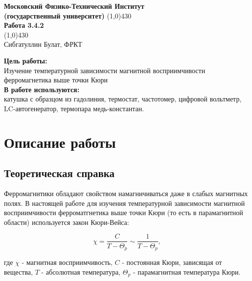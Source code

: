 \documentclass[a4paper, 12pt]{article}%
\begin{document}
\begin{titlepage}

\begin{center}
\large\textbf{Московский Физико-Технический Институт}\\
\large\textbf{(государственный университет)}
\vfill
\line(1,0){430}\\[1mm]
\huge\textbf{Работа 3.4.2}\\
\line(1,0){430}\\[1mm]
\vfill
\large Сибгатуллин Булат, ФРКТ\\
\end{center}

\end{titlepage}

\noindent \textbf{Цель работы:} \\
\indent Изучение температурной зависимости магнитной восприимчивости ферромагнетика выше точки Кюри\\
\noindent \textbf{В работе используются:} \\
\indent катушка с образцом из гадолиния, термостат, частотомер, цифровой вольтметр, LC-автогенератор, термопара медь-константан.

\section*{Описание работы}

\subsection*{Теоретическая справка}

Ферромагнитики обладают свойством намагничиваться даже в слабых магнитных полях. В настоящей работе для изучения температурной зависимости магнитной восприимчивости ферроматгнетика выше точки Кюри (то есть в парамагнитной области) используется закон Кюри-Вейса:

\begin{equation}
\chi = \frac{C}{T - \Theta_p} \sim \frac{1}{T - \Theta_p},
\end{equation}

где $\chi$ - магнитная восприимчивость, $C$ - постоянная Кюри, зависящая от вещества, $T$ - абсолютная температура, $\Theta_p$ - парамагнитная температура Кюри.

\vspace{0.5cm}
\end{document}
